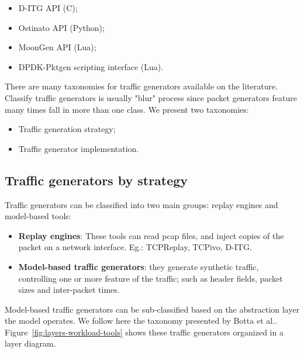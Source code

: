 \begin{itemize}
\item D-ITG API (C)\cite{web-ditg};
\item Ostinato API (Python)\cite{web-ostinato};
\item MoonGen API (Lua)\cite{web-moongen};
\item DPDK-Pktgen scripting interface (Lua)\cite{web-dpdk-pktgen}.
\end{itemize}

There are many taxonomies for traffic generators available on the literature. Classify traffic generators is usually "blur" process since packet generators feature many times fall in more than one class. We present two  taxonomies: 

\begin{itemize}
\item Traffic generation strategy;
\item Traffic generator implementation.
\end{itemize}

\subsection{Traffic generators by strategy}


Traffic generators can be classified into two main groups: replay engines\cite{sourcesonoff-paper} and model-based tools:

\begin{itemize}
\item \textbf{Replay engines}: These tools can read pcap files, and inject copies of the packet on a network interface. Eg.: TCPReplay\cite{web-tcpreplay}, TCPivo\cite{tcpivo-paper}, D-ITG\cite{ditg-paper}.
\item \textbf{Model-based traffic generators}: they generate synthetic traffic, controlling one or more feature of the traffic; such as header fields, packet sizes and inter-packet times.  
\end{itemize}

Model-based traffic generators can be sub-classified based on the abstraction layer the model operates. We follow here the taxonomy presented by Botta et al.\cite{do-you-trust}. Figure~\ref{fig:layers-workload-tools} shows these traffic generators organized in a layer diagram.


